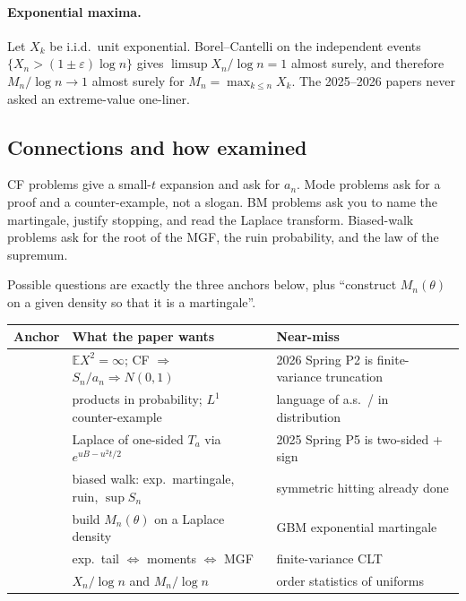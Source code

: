 \paragraph{Exponential maxima.}
 Let \(X_{k}\) be i.i.d.\ unit exponential. Borel--Cantelli on the independent events \(\{X_{n}>(1\pm\varepsilon)\log n\}\) gives \(\limsup X_{n}/\log n=1\) almost surely, and therefore \(M_{n}/\log n\to 1\) almost surely for \(M_{n}=\max_{k\le n}X_{k}\). The 2025--2026 papers never asked an extreme-value one-liner.

\subsection{Connections and how examined}

CF problems give a small-\(t\) expansion and ask for \(a_{n}\). Mode problems ask for a proof and a counter-example, not a slogan. BM problems ask you to name the martingale, justify stopping, and read the Laplace transform. Biased-walk problems ask for the root of the MGF, the ruin probability, and the law of the supremum.

Possible questions are exactly the three anchors below, plus ``construct \(M_{n}(\theta)\) on a given density so that it is a martingale''.

{\footnotesize
\begin{center}
\begin{tabular}{@{}L{2.7cm}L{5.4cm}L{6.1cm}@{}}
\toprule
Anchor & What the paper wants & Near-miss \\
\midrule
{} & \(\mathbb{E}X^{2}=\infty\); CF \(\Rightarrow\) \(S_{n}/a_{n}\Rightarrow N(0,1)\) & 2026 Spring P2 is finite-variance truncation \\
 & products in probability; \(L^{1}\) counter-example & language of a.s.\ / in distribution \\
 & Laplace of one-sided \(T_{a}\) via \(e^{uB-u^{2}t/2}\) & 2025 Spring P5 is two-sided + sign \\
 & biased walk: exp.\ martingale, ruin, \(\sup S_{n}\) & symmetric hitting already done \\
 & build \(M_{n}(\theta)\) on a Laplace density & GBM exponential martingale \\
 & exp.\ tail \(\Leftrightarrow\) moments \(\Leftrightarrow\) MGF & finite-variance CLT \\
 & \(X_{n}/\log n\) and \(M_{n}/\log n\) & order statistics of uniforms \\
\bottomrule
\end{tabular}
\end{center}
}
